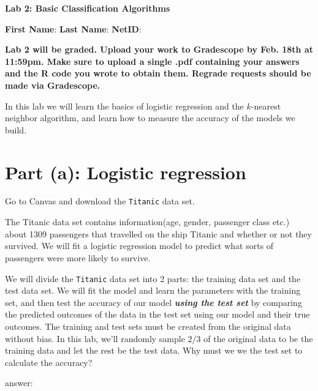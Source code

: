 \documentclass{article}
\newcommand{\answerbox}[1]{
	\begin{center}
		\ifdefined\printsol
			\begin{mdframed}
				\begin{minipage}{0.95\textwidth}
					{\color{blue} {#1}}
				\end{minipage}
			\end{mdframed}
		\else
			\begin{mdframed}
				\begin{minipage}{0.95\textwidth}
					\phantom{\parbox{\linewidth}{#1}}
				\end{minipage}
			\end{mdframed}
		\fi
		\end{center}
	}
\begin{document}
        \begin{center}
                {\Large \bf Lab 2: Basic Classification Algorithms}

                    \bigskip

                        {\bf First Name}: \underline{\hspace{2.5cm}}  {\bf Last Name}: \underline{\hspace{2.5cm}} {\bf NetID}: \underline{\hspace{2.5cm}}
                    \end{center}



				\textbf{Lab 2 will be graded. Upload your work to
					Gradescope by
				Feb. 18th at 11:59pm. Make sure to upload a single .pdf
				containing your answers and the R code you wrote to obtain
				them. Regrade requests should be made via Gradescope.}


\bigskip

In this lab we will learn the basics of logistic regression and the $k$-nearest
neighbor algorithm, and learn how to measure the accuracy of the models we
build.

\section*{Part (a): Logistic regression}

Go to Canvas and download the \texttt{Titanic} data set.

\bigskip

The Titanic data set contains information(age, gender, passenger class
etc.) about 1309 passengers that travelled on the ship Titanic and whether or
not they survived. We will fit a logistic regression model to predict
what sorts of passengers were more likely to survive.

\bigskip

We will divide the {\tt{Titanic}} data set into 2 parts: the training data set
and the test data set. We will fit the model and learn the
parameters with the training set, and then test the accuracy of our
model \emph{\textbf{using the test set}} by comparing the predicted outcomes of the data
in the test set using our model and their true outcomes. The training
and test sets must be created from the original data without bias. In
this lab, we'll randomly sample $2/3$ of the original data to be the
training data and let the rest be the test data.
Why must we we the test set to calculate the accuracy?
\answerbox{
answer:
}
\end{document}
